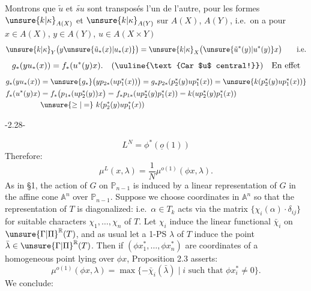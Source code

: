 Montrons que  $\tilde u$ et $\widetilde{su}$ sont transposés l'un de l'autre, pour les formes $\unsure{k|\kappa}_{A(X)}$ et $\unsure{k|\kappa}_{A(Y)}$ sur $A(X)$, $A(Y)$, i.e.\ on a pour $x\in A(X)$, $y\in A(Y)$, $u\in A(X\times Y)$
\[
\unsure{k|\kappa}_Y\bigl(y\unsure{\tilde u_*(x)|u_*(x)}\bigr)=\unsure{k|\kappa}_X\bigl(\unsure{\tilde u^*(y)|u^*(y)}x\bigr)\qquad\text{i.e.}
\]
\[
g_*(y u_*(x))=f_*(u^*(y)x).\quad(\uuline{\text{Car $u$ central!}})\quad\text{En effet}
\]
\[
\begin{aligned}
g_*(y u_*(x))
&=\unsure{g_*}\bigl(y p_{2*}(u p_1^*(x))\bigr)
=g_*p_{2*}(p_2^*(y)u p_1^*(x))
=\unsure{k(p_2^*(y)u p_1^*(x))}\\
f_*(u^*(y)x)
&=f_*\bigl(p_{1*}(u p_2^*(y))x\bigr)
=f_*p_{1*}(u p_2^*(y)p_1^*(x))
=k(u p_2^*(y)p_1^*(x))\\
&\unsure{\geq|=}\ k(p_2^*(y)u p_1^*(x))
\end{aligned}
\]
\begin{center}-2.28-\end{center}
\[
L^N=\phi^*(\underline{o}(1))
\]
Therefore:
\[
\mu^L(x,\lambda)=\frac1N\mu^{o(1)}(\phi x,\lambda).
\]
As in \S1, the action of $G$ on $\mathbb P_{n-1}$ is induced by a linear representation of $G$ in the affine cone $\mathbb A^n$ over $\mathbb P_{n-1}$. Suppose we choose coordinates in $\mathbb A^n$ so that the representation of $T$ is diagonalized: i.e.\ $\alpha\in T_k$ acts via the matrix $\{\chi_i(\alpha)\cdot\delta_{ij}\}$ for suitable characters $\chi_1,\ldots,\chi_n$ of $T$. Let $\chi_i$ induce the linear functional $\bar\chi_i$ on $\unsure{\Gamma|\Pi}^{\mathbb R}(T)$, and as usual let a 1-PS $\lambda$ of $T$ induce the point $\bar\lambda\in\unsure{\Gamma|\Pi}^{\mathbb R}(T)$. Then if $(\phi x_1^*,\ldots,\phi x_n^*)$ are coordinates of a homogeneous point lying over $\phi x$, Proposition 2.3 asserts:
\[
\mu^{o(1)}(\phi x,\lambda)=\max\{-\bar\chi_i(\bar\lambda)\mid i\text{ such that }\phi x_i^*\neq0\}.
\]
We conclude:


